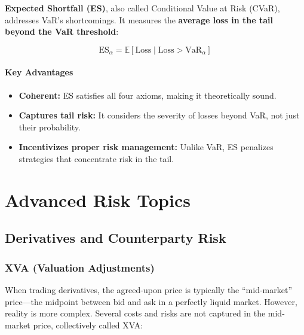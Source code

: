 \textbf{Expected Shortfall (ES)}, also called Conditional Value at Risk (CVaR), addresses VaR's shortcomings. It measures the \textbf{average loss in the tail beyond the VaR threshold}:

\begin{equation}
    \text{ES}_\alpha = \mathbb{E}[\text{Loss} \mid \text{Loss} > \text{VaR}_\alpha]
\end{equation}

\paragraph{Key Advantages}
\begin{itemize}
    \item \textbf{Coherent:} ES satisfies all four axioms, making it theoretically sound.
    \item \textbf{Captures tail risk:} It considers the severity of losses beyond VaR, not just their probability.
    \item \textbf{Incentivizes proper risk management:} Unlike VaR, ES penalizes strategies that concentrate risk in the tail.
\end{itemize}

\section{Advanced Risk Topics}

\subsection{Derivatives and Counterparty Risk}

\subsubsection{XVA (Valuation Adjustments)}

When trading derivatives, the agreed-upon price is typically the ``mid-market'' price—the midpoint between bid and ask in a perfectly liquid market. However, reality is more complex. Several costs and risks are not captured in the mid-market price, collectively called XVA:

